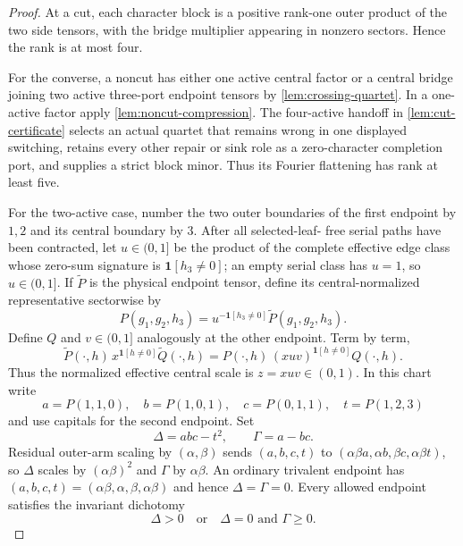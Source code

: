 \documentclass[11pt]{article}
\theoremstyle{remark}
\begin{document}
\begin{proof}
At a cut, each character block is a positive rank-one outer product of the
two side tensors, with the bridge multiplier appearing in nonzero sectors.
Hence the rank is at most four.

For the converse, a noncut has either one active central factor or a central
bridge joining two active three-port endpoint tensors by
\cref{lem:crossing-quartet}.  In a one-active factor apply
\cref{lem:noncut-compression}.  The four-active handoff in
\cref{lem:cut-certificate} selects an actual quartet that remains wrong in
one displayed switching, retains every other repair or sink role as a
zero-character completion port, and supplies a strict block minor.  Thus its
Fourier flattening has rank at least five.

For the two-active case, number the two outer boundaries of the first
endpoint by $1,2$ and its central boundary by $3$.  After all selected-leaf-
free serial paths have been contracted, let $u\in(0,1]$ be the product of
the complete effective edge class whose zero-sum signature is
$\mathbf1[h_3\ne0]$; an empty serial class has $u=1$, so
$u\in(0,1]$.  If $\widetilde P$ is the physical endpoint tensor,
define its central-normalized representative sectorwise by
\[
P(g_1,g_2,h_3)=u^{-\mathbf1[h_3\ne0]}
\widetilde P(g_1,g_2,h_3).
\]
Define $Q$ and $v\in(0,1]$ analogously at the other endpoint.  Term by term,
\[
\widetilde P(\cdot,h)\,x^{\mathbf1[h\ne0]}
\widetilde Q(\cdot,h)
=P(\cdot,h)\,(xuv)^{\mathbf1[h\ne0]}Q(\cdot,h).
\]
Thus the normalized effective central scale is $z=xuv\in(0,1)$.  In this
chart write
\[
a=P(1,1,0),\quad b=P(1,0,1),\quad c=P(0,1,1),
\quad t=P(1,2,3)
\]
and use capitals for the second endpoint.  Set
\[
\Delta=abc-t^2,\qquad \Gamma=a-bc.
\]
Residual outer-arm scaling by $(\alpha,\beta)$ sends
$(a,b,c,t)$ to
$(\alpha\beta a,\alpha b,\beta c,\alpha\beta t)$, so $\Delta$ scales by
$(\alpha\beta)^2$ and $\Gamma$ by $\alpha\beta$.  An ordinary trivalent
endpoint has $(a,b,c,t)=(\alpha\beta,\alpha,\beta,\alpha\beta)$ and hence
$\Delta=\Gamma=0$.  Every allowed endpoint satisfies the invariant
dichotomy
\begin{equation}\label{eq:endpoint-dichotomy}
\Delta>0\quad\text{or}\quad \Delta=0\text{ and }\Gamma\ge0.
\end{equation}


\end{proof}
\end{document}
